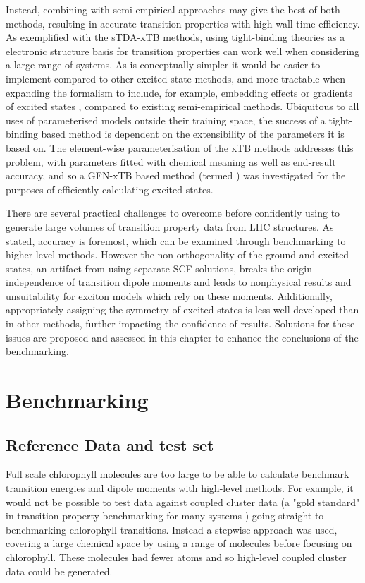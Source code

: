 Instead, combining \dscf with semi-empirical approaches may give the best of both
methods, resulting in accurate transition properties with high wall-time efficiency.
As exemplified with the sTDA-xTB methods, using tight-binding theories as a electronic 
structure basis for transition properties can work well when considering a large
range of systems. As \dscf is conceptually simpler it would be easier to implement
compared to other excited state methods, and more tractable when expanding the formalism
to include, for example, embedding effects or gradients of excited states \cite{Worster2021},
compared to existing semi-empirical methods. Ubiquitous to all uses of parameterised 
models outside their training space, the success of a tight-binding based \dscf 
method is dependent on the extensibility of the parameters it is based on. The element-wise
parameterisation of the xTB methods addresses this problem, with parameters fitted
with chemical meaning as well as end-result accuracy, and so a GFN-xTB based \dscf
method (termed \dxtb) was investigated for the purposes of efficiently calculating
excited states.

There are several practical challenges to overcome before confidently using \dscf
to generate large volumes of transition property data from LHC structures. As stated,
accuracy is foremost, which can be examined through benchmarking to higher level
methods. However the non-orthogonality of the ground and excited states, an artifact
from using separate SCF solutions, breaks the origin-independence of transition
dipole moments and leads to nonphysical results and unsuitability for exciton models
which rely on these moments. Additionally, appropriately assigning the symmetry of
excited states is less well developed than in other methods, further impacting the 
confidence of results. Solutions for these issues are proposed and assessed in this
chapter to enhance the conclusions of the benchmarking.

\section{Benchmarking \dscf}
\label{sec:benchmarking}
\subsection{Reference Data and test set}
\label{subsec:reference_data}

Full scale chlorophyll molecules are too large to be able to calculate benchmark
transition energies and dipole moments with high-level methods. For example, it would
not be possible to test \dscf data against coupled cluster data (a "gold standard"
in transition property benchmarking for many systems \cite{Donchev2021}) going straight
to benchmarking chlorophyll transitions. Instead a stepwise approach was used, covering
a large chemical space by using a range of molecules before focusing on chlorophyll.
These molecules had fewer atoms and so high-level coupled cluster data could be generated.

